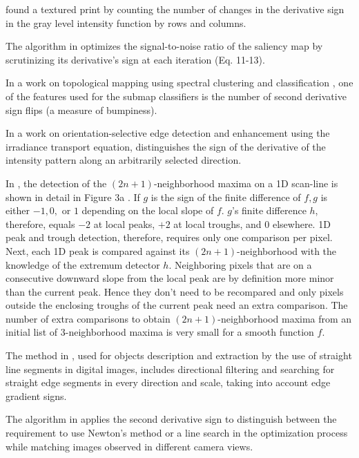 \documentclass[11pt]{book}
\begin{document}
\cite{grau2002texprint} found a textured print by counting the number
of changes in the derivative sign in the gray level intensity function
by rows and columns.

The algorithm in \cite{navalpakkam2006optimal} optimizes the signal-to-noise
ratio of the saliency map by scrutinizing its derivative's sign at
each iteration (Eq. 11-13).

In a work on topological mapping using spectral clustering and classification \cite{brunskill2007topological}, one of the features used for the submap classifiers is the number of second derivative sign flips (a measure of bumpiness).

In a work on orientation-selective edge detection and enhancement using the irradiance transport equation, \cite{flores2010orientation} distinguishes
the sign of the derivative of the intensity pattern along an arbitrarily
selected direction.

In \cite{pham2010non}, the detection of the $\left(2n+1\right)$-neighborhood
maxima on a 1D scan-line is shown in detail in Figure 3a . If $g$
is the sign of the finite difference of $f,g$ is either $-1,0,$
or $1$ depending on the local slope of $f$. $g$'s finite difference
$h$, therefore, equals $-2$ at local peaks, $+2$ at local troughs,
and $0$ elsewhere. 1D peak and trough detection, therefore, requires
only one comparison per pixel. Next, each 1D peak is compared against
its $\left(2n+1\right)$-neighborhood with the knowledge of the extremum
detector $h$. Neighboring pixels that are on a consecutive downward
slope from the local peak are by definition more minor than the current
peak. Hence they don't need to be recompared and only pixels outside
the enclosing troughs of the current peak need an extra comparison.
The number of extra comparisons to obtain $\left(2n+1\right)$-neighborhood
maxima from an initial list of 3-neighborhood maxima is very small
for a smooth function $f$.

The method in \cite{volkov2011objects}, used for objects description and extraction by the use of straight line
segments in digital images, includes directional filtering
and searching for straight edge segments in every direction and scale,
taking into account edge gradient signs.

The algorithm in \cite{li2013locally} applies the second derivative
sign to distinguish between the requirement to use Newton's method
or a line search in the optimization process while matching images
observed in different camera views.
\end{document}
